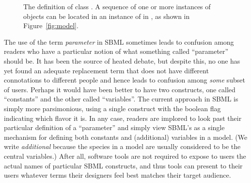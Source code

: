 \begin{figure}[htb]
  \centering
  \small
  \caption{The definition of class \Parameter.  A
      sequence of one or more instances of \Parameter objects can
      be located in an instance of \ListOfParameters in \Model, as
      shown in Figure~\protect\ref{fig:model}.}
  \label{fig:parameter}
\end{figure}

The use of the term \emph{parameter} in SBML sometimes leads to
confusion among readers who have a particular notion of what
something called ``parameter'' should be.  It has been the source
of heated debate, but despite this, no one has yet found an
adequate replacement term that does not have different
connotations to different people and hence leads to confusion
among \emph{some} subset of users.  Perhaps it would have been
better to have two constructs, one called ``constants'' and the
other called ``variables''.  The current approach in SBML is
simply more parsimonious, using a single \Parameter construct with
the boolean flag  indicating which flavor it is.
In any case, readers are implored to look past their particular
definition of a ``parameter'' and simply view SBML's \Parameter as
a single mechanism for defining both constants and (additional)
variables in a model.  (We write \emph{additional} because the
species in a model are usually considered to be the central
variables.)  After all, software tools are not required to expose
to users the actual names of particular SBML constructs, and thus
tools can present to their users whatever terms their designers
feel best matches their target audience.


